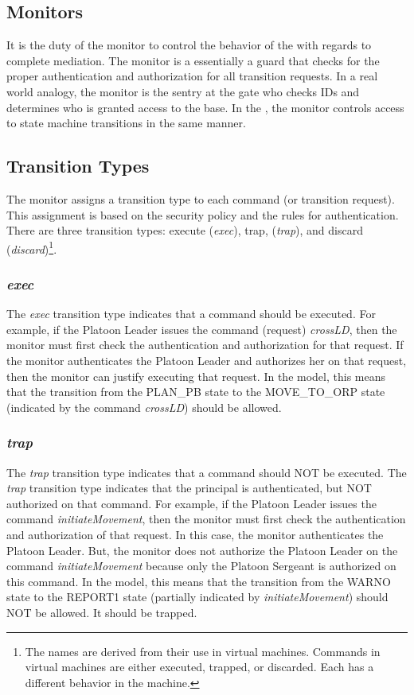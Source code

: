 \documentclass[../../main/main.tex]{subfiles}
\begin{document}
 
\subsection{Monitors}\label{monitors}
It is the duty of the monitor to control the behavior of the  with regards to complete mediation.  The monitor is a essentially a guard that checks for the proper authentication and authorization for all  transition requests.  In a real world analogy, the monitor is the sentry at the gate who checks IDs and determines who is granted access to the base.  In the , the monitor controls access to state machine transitions in the same manner.

\subsection{Transition Types}
The monitor assigns a transition type to each command (or  transition request). This assignment is based on the security policy and the rules for authentication.  There are three transition types: execute (\textit{exec}), trap, (\textit{trap}), and discard (\textit{discard})\footnote{The names are derived from their use in virtual machines.  Commands in virtual machines are either executed, trapped, or discarded.  Each has a different behavior in the machine.}.  

\subsubsection{\textit{exec}}
The \textit{exec} transition type indicates that a command should be executed.  For example, if the Platoon Leader issues the command (request) \textit{crossLD}, then the monitor must first check the authentication and authorization for that request.  If the monitor authenticates the Platoon Leader and authorizes her on that request, then the monitor can justify executing that request.  In the  model, this means that the transition from the PLAN_PB state to the MOVE_TO_ORP state (indicated by the command \textit{crossLD}) should be allowed. 
\subsubsection{\textit{trap}}
The \textit{trap} transition type indicates that a command should NOT be executed.  The \textit{trap} transition type indicates that the principal is authenticated, but NOT authorized on that command.  For example, if the Platoon Leader issues the command \textit{initiateMovement}, then the monitor must first check the authentication and authorization of that request.  In this case, the monitor authenticates the Platoon Leader.  But, the monitor does not authorize the Platoon Leader on the command \textit{initiateMovement} because only the Platoon Sergeant is authorized on this command.  In the  model, this means that the transition from the WARNO state to the REPORT1 state (partially indicated by \textit{initiateMovement}) should NOT be allowed.  It should be trapped.
\end{document}
